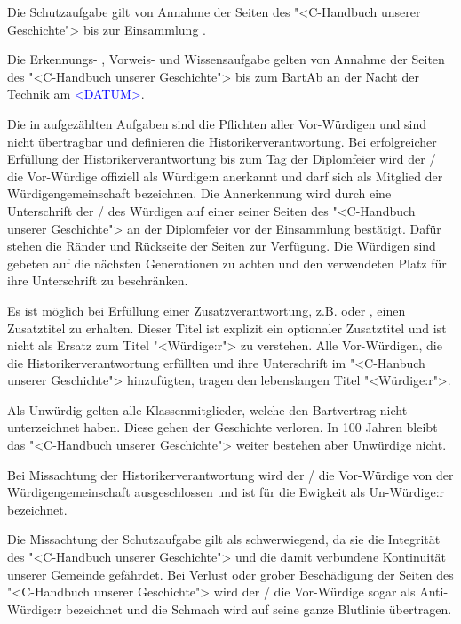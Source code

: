 \documentclass[fontsize=12pt,parskip=half]{scrartcl}
\begin{document}
\begin{contract}
  \SubClause[title={Dauer}]
  Die Schutzaufgabe  gilt von Annahme der Seiten des "<C-Handbuch unserer Geschichte"> bis zur Einsammlung .

  Die Erkennungs- , Vorweis-  und Wissensaufgabe  gelten von Annahme der Seiten
  des "<C-Handbuch unserer Geschichte"> bis zum BartAb an der Nacht der Technik am \textcolor{blue}{<DATUM>}.

  \Clause[title={Historikerverantwortung}]\label{H.verantwortung}
  Die in  aufgezählten Aufgaben sind die Pflichten aller Vor-Würdigen und sind nicht übertragbar und definieren die Historikerverantwortung.
  Bei erfolgreicher Erfüllung der Historikerverantwortung bis zum Tag der Diplomfeier wird der / die Vor-Würdige offiziell als Würdige:n anerkannt und darf sich
  als Mitglied der Würdigengemeinschaft bezeichnen. Die Annerkennung wird durch eine Unterschrift der / des Würdigen auf einer seiner Seiten des "<C-Handbuch unserer Geschichte">
  an der Diplomfeier vor der Einsammlung  bestätigt. Dafür stehen die Ränder und Rückseite der Seiten zur Verfügung. Die Würdigen sind
  gebeten auf die nächsten Generationen zu achten und den verwendeten Platz für ihre Unterschrift zu beschränken.

  \SubClause[title={Zusatztitel}]
  Es ist möglich bei Erfüllung einer Zusatzverantwortung, z.B.  oder , einen Zusatztitel zu erhalten. Dieser Titel ist explizit ein optionaler
  Zusatztitel und ist nicht als Ersatz zum Titel "<Würdige:r"> zu verstehen. Alle Vor-Würdigen, die die Historikerverantwortung  erfüllten und ihre Unterschrift
  im "<C-Hanbuch unserer Geschichte"> hinzufügten, tragen den lebenslangen Titel "<Würdige:r">.

  \Clause[title={Unwürdige}]
  Als Unwürdig gelten alle Klassenmitglieder, welche den Bartvertrag nicht unterzeichnet haben. Diese gehen der Geschichte verloren. In 100 Jahren bleibt das
  "<C-Handbuch unserer Geschichte"> weiter bestehen aber Unwürdige nicht.

  Bei Missachtung der Historikerverantwortung  wird der / die Vor-Würdige von der Würdigengemeinschaft ausgeschlossen und ist für die Ewigkeit als
  Un-Würdige:r bezeichnet.

  \Clause[title={Anti-Würdige}]
  Die Missachtung der Schutzaufgabe  gilt als schwerwiegend, da sie die Integrität des "<C-Handbuch unserer Geschichte"> und die
  damit verbundene Kontinuität unserer Gemeinde gefährdet. Bei Verlust oder grober Beschädigung der Seiten des "<C-Handbuch unserer Geschichte"> wird der / die Vor-Würdige sogar als
  Anti-Würdige:r bezeichnet und die Schmach wird auf seine ganze Blutlinie übertragen.


\end{contract}
\end{document}
